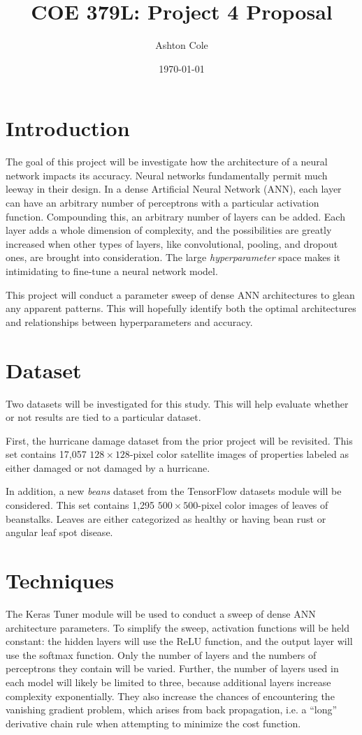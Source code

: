 \documentclass{article}
\title{COE 379L: Project 4 Proposal}
\author{Ashton Cole}
\date{\today}
\begin{document}
\maketitle

\section{Introduction}

The goal of this project will be investigate how the architecture of a neural network impacts its accuracy. Neural networks fundamentally permit much leeway in their design. In a dense Artificial Neural Network (ANN), each layer can have an arbitrary number of perceptrons with a particular activation function. Compounding this, an arbitrary number of layers can be added. Each layer adds a whole dimension of complexity, and the possibilities are greatly increased when other types of layers, like convolutional, pooling, and dropout ones, are brought into consideration. The large \emph{hyperparameter} space makes it intimidating to fine-tune a neural network model.

This project will conduct a parameter sweep of dense ANN architectures to glean any apparent patterns. This will hopefully identify both the optimal architectures and relationships between hyperparameters and accuracy.

\section{Dataset}

Two datasets will be investigated for this study. This will help evaluate whether or not results are tied to a particular dataset.

First, the hurricane damage dataset from the prior project will be revisited. This set contains 17,057 $128 \times 128$-pixel color satellite images of properties labeled as either damaged or not damaged by a hurricane.

In addition, a new \emph{beans} dataset from the TensorFlow datasets module will be considered. This set contains 1,295 $500 \times 500$-pixel color images of leaves of beanstalks. Leaves are either categorized as healthy or having bean rust or angular leaf spot disease.

\section{Techniques}

The Keras Tuner module will be used to conduct a sweep of dense ANN architecture parameters. To simplify the sweep, activation functions will be held constant: the hidden layers will use the ReLU function, and the output layer will use the softmax function. Only the number of layers and the numbers of perceptrons they contain will be varied. Further, the number of layers used in each model will likely be limited to three, because additional layers increase complexity exponentially. They also increase the chances of encountering the vanishing gradient problem, which arises from back propagation, i.e. a ``long'' derivative chain rule when attempting to minimize the cost function.
\end{document}
